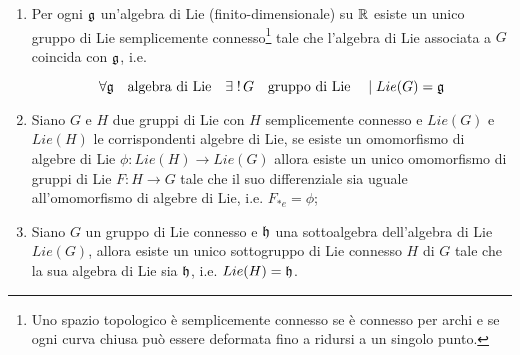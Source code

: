 \begin{theorem}\hfill\break
	\begin{enumerate}
		\item Per ogni $ \mathfrak{g} $ un'algebra di Lie (finito-dimensionale) su $ \mathbb{R} $ esiste un unico gruppo di Lie semplicemente connesso\footnote{%
			Uno spazio topologico è semplicemente connesso se è connesso per archi e se ogni curva chiusa può essere deformata fino a ridursi a un singolo punto.%
		} tale che l'algebra di Lie associata a $ G $ coincida con $ \mathfrak{g} $, i.e.
		
		\begin{equation}
			\forall \g \qq{algebra di Lie} \E ! \, G \qq{gruppo di Lie} \mid Lie(G) = \g
		\end{equation}
	
		\item Siano $ G $ e $ H $ due gruppi di Lie con $ H $ semplicemente connesso e $ Lie(G) $ e $ Lie(H) $ le corrispondenti algebre di Lie, se esiste un omomorfismo di algebre di Lie $ \phi : Lie(H) \to Lie(G) $ allora esiste un unico omomorfismo di gruppi di Lie $ F : H \to G $ tale che il suo differenziale sia uguale all'omomorfismo di algebre di Lie, i.e. $ F_{*e} = \phi $;
		
		\item Siano $ G $ un gruppo di Lie connesso e $ \mathfrak{h} $ una sottoalgebra dell'algebra di Lie $ Lie(G) $, allora esiste un unico sottogruppo di Lie connesso $ H $ di $ G $ tale che la sua algebra di Lie sia $ \mathfrak{h} $, i.e. $ Lie(H) = \mathfrak{h} $.
	\end{enumerate}
\end{theorem}

